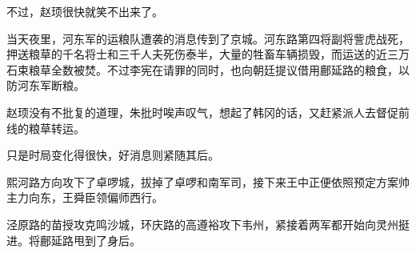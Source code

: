 不过，赵顼很快就笑不出来了。

当天夜里，河东军的运粮队遭袭的消息传到了京城。河东路第四将副将訾虎战死，押送粮草的千名将士和三千人夫死伤泰半，大量的牲畜车辆损毁，而运送的近三万石束粮草全数被焚。不过李宪在请罪的同时，也向朝廷提议借用鄜延路的粮食，以防河东军断粮。

赵顼没有不批复的道理，朱批时唉声叹气，想起了韩冈的话，又赶紧派人去督促前线的粮草转运。

只是时局变化得很快，好消息则紧随其后。

熙河路方向攻下了卓啰城，拔掉了卓啰和南军司，接下来王中正便依照预定方案帅主力向东，王舜臣领偏师西行。

泾原路的苗授攻克鸣沙城，环庆路的高遵裕攻下韦州，紧接着两军都开始向灵州挺进。将鄜延路甩到了身后。

